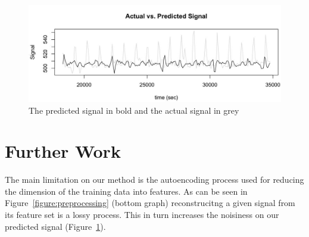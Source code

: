 \documentclass[12pt]{article}
\begin{document}
 \begin{figure}
\captionsetup{justification=raggedright}
\includegraphics[width=\textwidth]{images/actual_vs_pred_signal.jpg}
\caption{The predicted signal in bold and the actual signal in grey \label{figure:pred}}
\end{figure}

 \section{Further Work}
The main limitation on our method is the autoencoding process used for reducing the dimension of the training data into features. As can be seen in Figure~\ref{figure:preprocessing} (bottom graph) reconstrucitng a given signal from its feature set is a lossy process. This in turn increases the noisiness on our predicted signal (Figure~\ref{figure:pred}).



  
\end{document}
